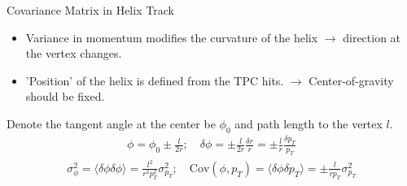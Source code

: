 \documentclass[
	xcolor=dvipsnames,
	aspectratio=169,	
	10pt, 
	]{beamer}
\begin{document}
\begin{frame}{Covariance Matrix in Helix Track}
	\begin{block}{}
		{
			\begin{itemize}
				\item Variance in momentum modifies the curvature of the helix $\to$ direction at the vertex changes.
				\item 'Position' of the helix is defined from the TPC hits. $\to $ Center-of-gravity should be fixed.
			\end{itemize} 
		}
		Denote the tangent angle at the center be $\phi_0$ and path length to the vertex $l$.
		\begin{align}
			\phi = \phi_0 \pm \frac{l}{2r};\quad  \delta\phi = \pm\frac{l}{2r}\frac{\delta r}{r}= \pm\frac{l}{r}\frac{\delta p_T}{p_T}
		\end{align}
		\begin{align}
			\sigma_{\phi}^2 = \langle\delta\phi\delta\phi\rangle=\frac{l^2}{r^2p_{T}^2}\sigma^2_{p_T};\quad \textrm{Cov}(\phi,p_T)= \langle\delta\phi\delta p_T \rangle = \pm \frac{l}{rp_T}\sigma_{p_T}^2
		\end{align}
	\end{block}
\end{frame}
\end{document}
